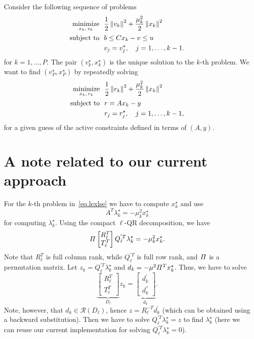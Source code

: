 \documentclass[12pt]{article}
\begin{document}
Consider the following sequence of problems
%
\begin{align*}
  \begin{split}
    \mathop{\mbox{minimize}}_{x_k, \, v_k} \ \  & \frac{1}{2}\left\lVert v_k\right\rVert^2 + \frac{\mu_k^2}{2}\left\lVert x_k\right\rVert^2\\
    \mbox{subject to} \ \  & b \leq Cx_k - v \leq u \\
    & v_j = v_j^{\star}, \quad j=1,\dots,k-1.
  \end{split}
\end{align*}
%
for $k=1,\dots,P$. The pair $(v_k^{\star},x_k^{\star})$ is the unique solution to the $k$-th
problem. We want to find $(v_P^{\star},x_P^{\star})$ by repeatedly solving
%
\begin{align}
  \begin{split} \label{eq.lexlse}
    \mathop{\mbox{minimize}}_{x_k, \, r_k} \ \  & \frac{1}{2}\left\lVert r_k\right\rVert^2 + \frac{\mu_k^2}{2}\left\lVert x_k\right\rVert^2\\
    \mbox{subject to} \ \  & r = Ax_k - y \\
    & r_j = r_j^{\star}, \quad j=1,\dots,k-1,
  \end{split}
\end{align}
%
for a given guess of the active constraints defined in terms of $(A,y)$.

\section{A note related to our current approach}

For the $k$-th problem in~\eqref{eq.lexlse} we have to compute $x_k^{\star}$ and use
%
\[
A^T\lambda_{k}^{\star} = -\mu_k^2x^{\star}_k
\]
%
for computing $\lambda_{k}^{\star}$. Using the compact $\ell$-QR decomposition, we have
%
\[
\mathnormal{\Pi}\begin{bmatrix}R_{\ell}^T \\ T_{\ell}^T\end{bmatrix}
Q_{\ell}^{'T}\lambda_{k}^{\star} = -\mu_k^2x^{\star}_k.
\]
%
Note that $R_{\ell}^T$ is full column rank, while $Q_{\ell}^{'T}$ is full row rank, and
$\mathnormal{\Pi}$ is a permutation matrix. Let $z_k = Q_{\ell}^{'T}\lambda_{k}^{\star}$ and $d_k =
-\mu^2\mathnormal{\Pi}^Tx^{\star}_k$. Thus, we have to solve
%
\[
\underbrace{\begin{bmatrix}R_{\ell}^T \\ T_{\ell}^T\end{bmatrix}}_{D_{\ell}}z_k = \underbrace{\begin{bmatrix} d_k^{'} \\ d_k^{''}\end{bmatrix}}_{d_k}.
\]
%
Note, however, that $d_k \in \mathcal{R}(D_{\ell})$, hence $z = R_{\ell}^{-T}d_k^{'}$ (which can be
obtained using a backward substitution). Then we have to solve $Q_{\ell}^{'T}\lambda_{k}^{\star} =
z$ to find $\lambda_{k}^{\star}$ (here we can reuse our current implementation for solving
$Q_{\ell}^{'T}\lambda_{k}^{\star} = 0$).
\end{document}

